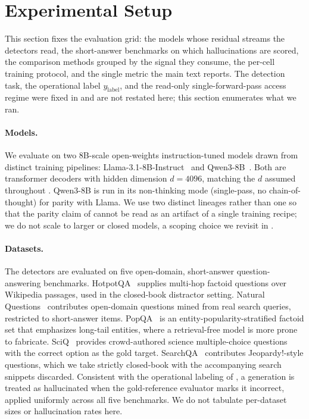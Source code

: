 \section{Experimental Setup}
\label{sec:hd:setup}

This section fixes the evaluation grid: the models whose residual streams the detectors read, the short-answer benchmarks on which hallucinations are scored, the comparison methods grouped by the signal they consume, the per-cell training protocol, and the single metric the main text reports. The detection task, the operational label $y_{\mathrm{label}}$, and the read-only single-forward-pass access regime were fixed in  and are not restated here; this section enumerates what we ran.

\paragraph{Models.}
We evaluate on two $8$B-scale open-weights instruction-tuned models drawn from distinct training pipelines: Llama-3.1-8B-Instruct~\citep{grattafiori2024llama3} and Qwen3-8B~\citep{yang2025qwen3}. Both are transformer decoders with hidden dimension $d = 4096$, matching the $d$ assumed throughout . Qwen3-8B is run in its non-thinking mode (single-pass, no chain-of-thought) for parity with Llama. We use two distinct lineages rather than one so that the parity claim of  cannot be read as an artifact of a single training recipe; we do not scale to larger or closed models, a scoping choice we revisit in .

\paragraph{Datasets.}
The detectors are evaluated on five open-domain, short-answer question-answering benchmarks. HotpotQA~\citep{yang2018hotpotqa} supplies multi-hop factoid questions over Wikipedia passages, used in the closed-book distractor setting. Natural Questions~\citep{kwiatkowski2019natural} contributes open-domain questions mined from real search queries, restricted to short-answer items. PopQA~\citep{mallen2023popqa} is an entity-popularity-stratified factoid set that emphasizes long-tail entities, where a retrieval-free model is more prone to fabricate. SciQ~\citep{welbl2017sciq} provides crowd-authored science multiple-choice questions with the correct option as the gold target. SearchQA~\citep{dunn2017searchqa} contributes Jeopardy!-style questions, which we take strictly closed-book with the accompanying search snippets discarded. Consistent with the operational labeling of , a generation is treated as hallucinated when the gold-reference evaluator marks it incorrect, applied uniformly across all five benchmarks. We do not tabulate per-dataset sizes or hallucination rates here.


